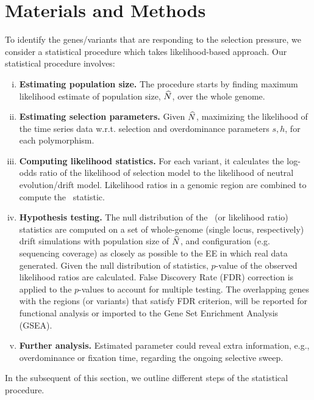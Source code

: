 \section{Materials and Methods}
\label{sec:method}
To identify the genes/variants that are responding to the selection pressure, we
consider a statistical procedure which takes likelihood-based
approach. 
Our statistical procedure involves:
\begin{enumerate}[(i)]
	\item  {\bf Estimating population size.} The procedure starts by 
	finding 
	maximum likelihood estimate of population size, 
	$\widehat{N}$, over the whole genome.
	\item {\bf Estimating selection parameters.} Given $\widehat{N}$, 
	maximizing the 
	likelihood of the time series data w.r.t. 
	selection and overdominance parameters $s,h$, for each	
	polymorphism.
	\item {\bf Computing likelihood statistics.} For each variant, it 
	calculates the log-odds 
	ratio of the likelihood of selection model to the likelihood of neutral
	evolution/drift model. Likelihood ratios in a genomic region
	are combined to compute the \comale\ statistic. 
	\item {\bf Hypothesis testing.} The null distribution of the \comale\ (or 
	likelihood ratio) 
	statistics are computed on 
	a set of whole-genome (single locus, respectively) drift simulations with 
	population size of $\widehat{N}$, and 
	configuration (e.g. sequencing coverage) as closely as possible to the EE 
	in which real data generated. Given the null distribution of statistics, 
	$p$-value of the observed likelihood ratios are calculated.
	False Discovery Rate (FDR) correction is applied to the $p$-values 
	to 
	account for multiple testing. The overlapping genes with the 
	regions (or variants) that 
	satisfy FDR criterion, 
	will be reported for functional analysis or imported to the Gene Set 
	Enrichment Analysis (GSEA).
	\item {\bf Further analysis.} Estimated parameter could reveal 
	extra 
	information, e.g., overdominance or fixation time, regarding the ongoing 
	selective sweep.
\end{enumerate}
In the subsequent of this section, we outline different steps of the 
statistical procedure.
